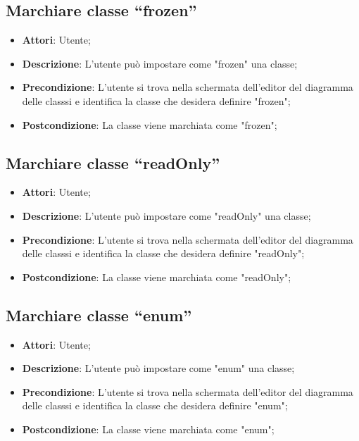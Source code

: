 \documentclass[../AnalisiDeiRequisiti.tex]{subfiles}
\begin{document}
			\subsection{Marchiare classe “frozen”}
			\begin{itemize}
				\item \textbf{Attori}: Utente;
				\item \textbf{Descrizione}: L'utente può impostare come "frozen" una classe;
				\item \textbf{Precondizione}: L’utente si trova nella schermata dell’editor del diagramma delle classsi e identifica la classe che desidera definire "frozen";
				\item \textbf{Postcondizione}: La classe viene marchiata come "frozen";
			\end{itemize}
			
			\subsection{Marchiare classe “readOnly”}
			\begin{itemize}
				\item \textbf{Attori}: Utente;
				\item \textbf{Descrizione}: L'utente può impostare come "readOnly" una classe;
				\item \textbf{Precondizione}: L’utente si trova nella schermata dell’editor del diagramma delle classsi e identifica la classe che desidera definire "readOnly";
				\item \textbf{Postcondizione}: La classe viene marchiata come "readOnly";
			\end{itemize}
			
			\subsection{Marchiare classe “enum”}
			\begin{itemize}
				\item \textbf{Attori}: Utente;
				\item \textbf{Descrizione}: L'utente può impostare come "enum" una classe;
				\item \textbf{Precondizione}: L’utente si trova nella schermata dell’editor del diagramma delle classsi e identifica la classe che desidera definire "enum";
				\item \textbf{Postcondizione}: La classe viene marchiata come "enum";
			\end{itemize}
			
\end{document}
